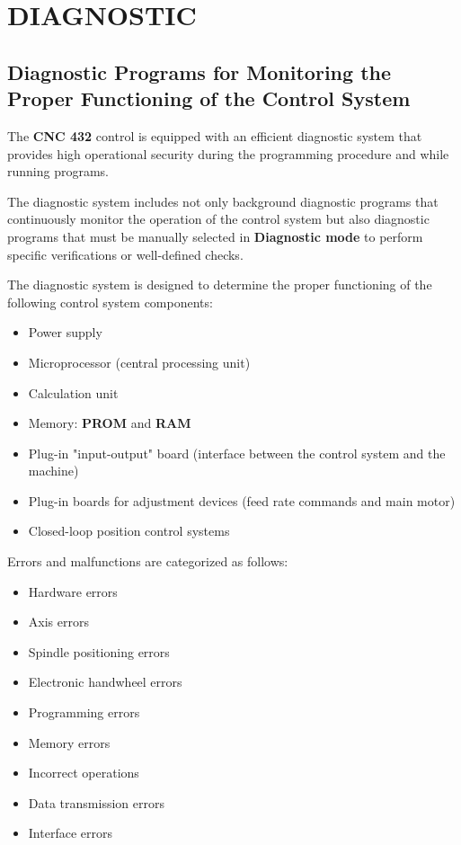 \chapter{DIAGNOSTIC}

\section{Diagnostic Programs for Monitoring the Proper Functioning of the Control System}

The \textbf{CNC 432} control is equipped with an efficient diagnostic system that provides high operational security during the programming procedure and while running programs.

The diagnostic system includes not only background diagnostic programs that continuously monitor the operation of the control system but also diagnostic programs that must be manually selected in \textbf{Diagnostic mode} to perform specific verifications or well-defined checks.

The diagnostic system is designed to determine the proper functioning of the following control system components:

\begin{itemize}
    \item Power supply
    \item Microprocessor (central processing unit)
    \item Calculation unit
    \item Memory: \textbf{PROM} and \textbf{RAM}
    \item Plug-in "input-output" board (interface between the control system and the machine)
    \item Plug-in boards for adjustment devices (feed rate commands and main motor)
    \item Closed-loop position control systems
\end{itemize}

Errors and malfunctions are categorized as follows:

\begin{itemize}
    \item Hardware errors
    \item Axis errors
    \item Spindle positioning errors
    \item Electronic handwheel errors
    \item Programming errors
    \item Memory errors
    \item Incorrect operations
    \item Data transmission errors
    \item Interface errors
\end{itemize}

